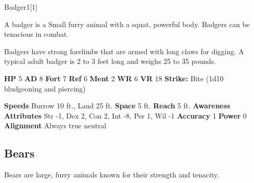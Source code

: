   
  \begin{monsection}{Badger}{1}[1]
    \vspace{-1em}\vspace{-1em}
    \vspace{0em}

    
        A badger is a Small furry animal with a squat, powerful body.
        Badgers can be tenacious in combat.
      
        Badgers have strong forelimbs that are armed with long claws for digging.
        A typical adult badger is 2 to 3 feet long and weighs 25 to 35 pounds.
      

    \begin{spellcontent}
      \begin{spelltargetinginfo}
        \pari \textbf{HP} 5 \monsep
          \textbf{AD} 8 \monsep
          \textbf{Fort} 7 \monsep
          \textbf{Ref} 6 \monsep
          \textbf{Ment} 2
        \pari \textbf{WR} 6 \monsep
        \textbf{VR} 18
        \pari \textbf{Strike:}
            Bite  (1d10 bludgeoning and piercing)
      \end{spelltargetinginfo}
    \end{spellcontent}
    \begin{monsterfooter}
      \pari \textbf{Speeds} Burrow 10 ft., Land 25 ft. \monsep
        \textbf{Space} 5 ft. \monsep
        \textbf{Reach} 5 ft.
      \pari \textbf{Awareness} 
      \pari \textbf{Attributes}
        Str -1, Dex 2,
        Con 2, Int -8,
        Per 1, Wil -1
      \pari \textbf{Accuracy} 1 \monsep
        \textbf{Power} 0
      \pari \textbf{Alignment} Always true neutral
    \end{monsterfooter}
  \end{monsection}
  
  
    \subsection{Bears}
      
        Bears are large, furry animals known for their strength and tenacity.
      

